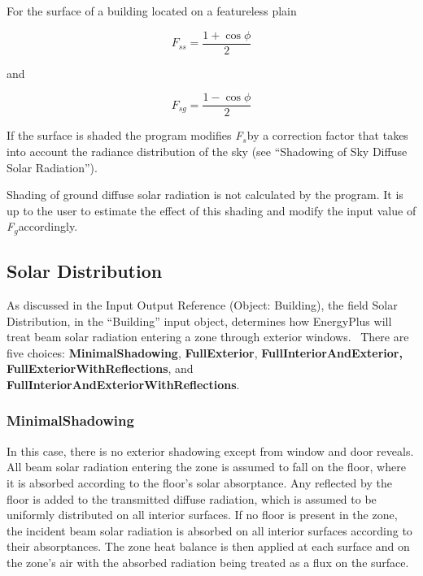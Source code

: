For the surface of a building located on a featureless plain

\begin{equation}
{F_{ss}} = \frac{{1 + \cos \phi }}{2}
\end{equation}

and

\begin{equation}
{F_{sg}} = \frac{{1 - \cos \phi }}{2}
\end{equation}

If the surface is shaded the program modifies \emph{F\(_{s}\)}by a correction factor that takes into account the radiance distribution of the sky (see ``Shadowing of Sky Diffuse Solar Radiation'').

Shading of ground diffuse solar radiation is not calculated by the program. It is up to the user to estimate the effect of this shading and modify the input value of \emph{F\(_{g}\)}accordingly.

\subsection{Solar Distribution}\label{solar-distribution}

As discussed in the Input Output Reference (Object: Building), the field Solar Distribution, in the ``Building'' input object, determines how EnergyPlus will treat beam solar radiation entering a zone through exterior windows.~ There are five choices: \textbf{MinimalShadowing}, \textbf{FullExterior}, \textbf{FullInteriorAndExterior, FullExteriorWithReflections}, and \textbf{FullInteriorAndExteriorWithReflections}.

\subsubsection{MinimalShadowing}\label{minimalshadowing}

In this case, there is no exterior shadowing except from window and door reveals. All beam solar radiation entering the zone is assumed to fall on the floor, where it is absorbed according to the floor's solar absorptance. Any reflected by the floor is added to the transmitted diffuse radiation, which is assumed to be uniformly distributed on all interior surfaces. If no floor is present in the zone, the incident beam solar radiation is absorbed on all interior surfaces according to their absorptances. The zone heat balance is then applied at each surface and on the zone's air with the absorbed radiation being treated as a flux on the surface.

